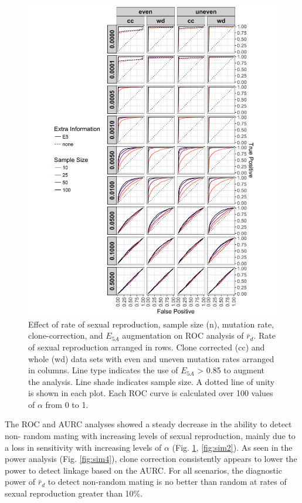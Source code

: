 \documentclass[double,11pt]{beavtex}
\begin{document}
  \begin{figure}
  
  {\centering \includegraphics[width=0.8\linewidth]{figure/simulations/ROC_Curve} 
  
  }
  
  \caption[Effect of rate of sexual reproduction, sample size, mutation rate,
  clone-correction, and \(E_{5A}\) augmentation on ROC analysis of
  \(\bar{r}_d\).]{Effect of rate of sexual reproduction, sample size (n), mutation rate,
  clone-correction, and \(E_{5A}\) augmentation on ROC analysis of
  \(\bar{r}_d\). Rate of sexual reproduction arranged in rows. Clone
  corrected (cc) and whole (wd) data sets with even and uneven mutation
  rates arranged in columns. Line type indicates the use of \(E_{5A}\)
  \textgreater{} 0.85 to augment the analysis. Line shade indicates sample
  size. A dotted line of unity is shown in each plot. Each ROC curve is
  calculated over 100 values of \(\alpha\) from 0 to 1.}\label{fig:simroc}
  \end{figure}
  
  \newpage
  
  The ROC and AURC analyses showed a steady decrease in the ability to
  detect non- random mating with increasing levels of sexual reproduction,
  mainly due to a loss in sensitivity with increasing levels of \(\alpha\)
  (Fig. \ref{fig:simroc}, \ref{fig:sim2}). As seen in the power analysis
  (Fig. \ref{fig:sim4}), clone correction consistently appears to lower
  the power to detect linkage based on the AURC. For all scenarios, the
  diagnostic power of \(\bar{r}_d\) to detect non-random mating is no
  better than random at rates of sexual reproduction greater than 10\%.
  
\end{document}
